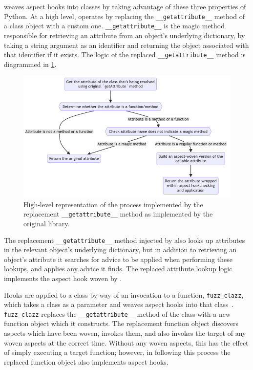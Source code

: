 \pdsf weaves aspect hooks into classes by taking advantage of these three
properties of Python. At a high level, \pdsf operates by replacing the
\lstinline{__getattribute__} method of a class object with a custom one.
\lstinline{__getattribute__} is the magic method responsible for retrieving an
attribute from an object's underlying dictionary, by taking a string argument as
an identifier and returning the object associated with that identifier if it
exists. The logic of the replaced \lstinline{__getattribute__} method is
diagrammed in \cref{fig:early_pdsf_replaced_getattr_diagram}.

\begin{figure}[hp]
\includegraphics[width=0.9\columnwidth]{30_prior_work/diagrams/replacement_getattr.png}
\caption{High-level representation of the process implemented by the replacement
\lstinline{__getattribute__} method as implemented by the original \pdsf{}
library.}
\label{fig:early_pdsf_replaced_getattr_diagram}
\end{figure}

The replacement \lstinline{__getattribute__} method injected by
\pdsf{} also looks up attributes in the relevant object's underlying dictionary,
but in addition to retrieving an object's attribute it searches for advice to be
applied when performing these lookups, and applies any advice it finds. The
replaced attribute lookup logic implements the aspect hook woven by \pdsf{}.

Hooks are applied to a class by way of an invocation to a function,
\lstinline{fuzz_clazz}, which takes a class as a parameter and weaves aspect
hooks into that class~\cite{pdsf_repo,asp_repo}. \lstinline{fuzz_clazz} replaces
the \lstinline{__getattribute__} method of the class with a new function
object which it constructs. The replacement function object discovers aspects
which have been woven, invokes them, and also invokes the target of any woven
aspects at the correct time. Without any woven aspects, this has the effect of
simply executing a target function; however, in following this process the
replaced function object also implements aspect hooks.

